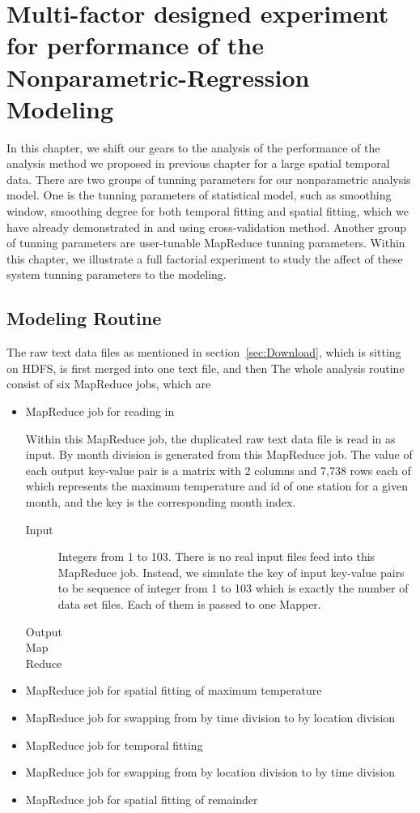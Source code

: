 \chapter{Multi-factor designed experiment for performance of the 
Nonparametric-Regression Modeling}

In this chapter, we shift our gears to the analysis of the performance of the 
analysis method we proposed in previous chapter for a large spatial temporal data.
There are two groups of tunning parameters for our nonparametric analysis model.
One is the tunning parameters of statistical model, such as smoothing window, 
smoothing degree for both temporal fitting and spatial fitting, which we have
already demonstrated in \cite{} and \cite{} using cross-validation method. Another
group of tunning parameters are user-tunable MapReduce tunning parameters. Within
this chapter, we illustrate a full factorial experiment to study the affect of
these system tunning parameters to the modeling.

\section{Modeling Routine}

The raw text data files as mentioned in section~\ref{sec:Download}, which is 
sitting on HDFS, is first merged into one text file, and then
The whole analysis routine consist of six MapReduce jobs, which are 

\begin{itemize}
\item MapReduce job for reading in

Within this MapReduce job, the duplicated raw text data file is read in as input. 
By month division is generated from this MapReduce job. The value of each output 
key-value pair is a matrix with 2 columns and 7,738 rows each of which represents
the maximum temperature and id of one station for a given month, and the key is
the corresponding month index.   
\begin{description}
  \item[Input] Integers from 1 to 103. There is no real input files feed into this
  MapReduce job. Instead, we simulate the key of input key-value pairs to be
  sequence of integer from 1 to 103 which is exactly the number of data set files. 
  Each of them is passed to one Mapper. 
  \item[Output] 
  \item[Map]  
  \item[Reduce] 
\end{description}



\item MapReduce job for spatial fitting of maximum temperature
\item MapReduce job for swapping from by time division to by location division
\item MapReduce job for temporal fitting  
\item MapReduce job for swapping from by location division to by time division
\item MapReduce job for spatial fitting of remainder
\end{itemize}

